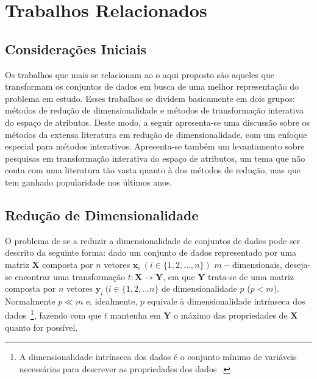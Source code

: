 \chapter{Trabalhos Relacionados}\label{chap:revisao}

\section{Considerações Iniciais}

Os trabalhos que mais se relacionam ao o aqui proposto são
aqueles que transformam os conjuntos de dados em busca de
uma melhor representação do problema em estudo. Esses
trabalhos se dividem basicamente em dois grupos: métodos de
redução de dimensionalidade e métodos de transformação
interativa do espaço de atributos. Deste modo, a seguir
apresenta-se uma discussão sobre os métodos da
extensa literatura em redução de dimensionalidade, com um
enfoque especial para métodos interativos. Apresenta-se
também um levantamento sobre pesquisas em transformação
interativa do espaço de atributos, um tema que não conta com uma
literatura tão vasta quanto à dos métodos de redução, mas
que tem ganhado popularidade nos últimos anos.

\section{Redução de Dimensionalidade}

O problema de se a reduzir a dimensionalidade de conjuntos
de dados pode ser descrito da seguinte forma: dado um
conjunto de dados representado por uma matriz $\textbf{X}$
composta por $n$ vetores $\textbf{x}_i~(i \in
\{1,2,...,n\})$ $m-$dimensionais, deseja-se encontrar uma
transformação $t: \textbf{X} \rightarrow \textbf{Y}$, em que 
$\textbf{Y}$ trata-se de uma matriz composta por $n$ vetores
$\textbf{y}_i~(i \in \{1,2,...n\}$ de dimensionalidade $p$
($p < m$).  Normalmente $p \ll m$ e, idealmente, $p$
equivale à dimensionalidade intrínseca dos dados~\footnote{A
dimensionalidade intrínseca dos dados é o conjunto mínimo de
variáveis necessárias para descrever as propriedades dos
dados~\cite{Fukunaga1990}.}, fazendo com que $t$ mantenha em
$\textbf{Y}$ o máximo das propriedades de $\textbf{X}$
quanto for possível. 

